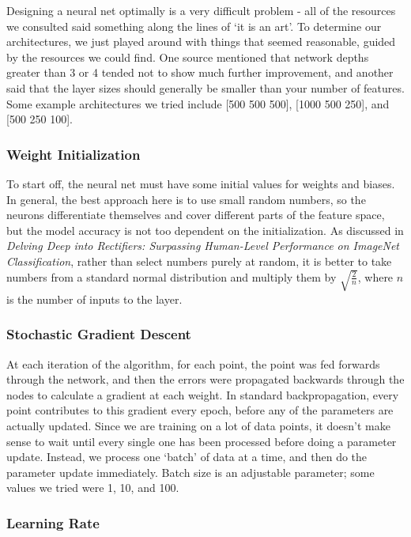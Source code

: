 \documentclass{article} %
\begin{document}
Designing a neural net optimally is a very difficult problem - all of the resources we consulted said something along the lines of `it is an art'. To determine our architectures, we just played around with things that seemed reasonable, guided by the resources we could find. One source mentioned that network depths greater than 3 or 4 tended not to show much further improvement, and another said that the layer sizes should generally be smaller than your number of features. Some example architectures we tried include [500 500 500], [1000 500 250], and [500 250 100].

\subsubsection*{Weight Initialization}

To start off, the neural net must have some initial values for weights and biases. In general, the best approach here is to use small random numbers, so the neurons differentiate themselves and cover different parts of the feature space, but the model accuracy is not too dependent on the initialization. As discussed in \emph{Delving Deep into Rectifiers: Surpassing Human-Level Performance on ImageNet Classification}, rather than select numbers purely at random, it is better to take numbers from a standard normal distribution and multiply them by $\sqrt{\frac{2}{n}}$, where $n$ is the number of inputs to the layer.

\subsubsection*{Stochastic Gradient Descent}

At each iteration of the algorithm, for each point, the point was fed forwards through the network, and then the errors were propagated backwards through the nodes to calculate a gradient at each weight. In standard backpropagation, every point contributes to this gradient every epoch, before any of the parameters are actually updated. Since we are training on a lot of data points, it doesn't make sense to wait until every single one has been processed before doing a parameter update. Instead, we process one `batch' of data at a time, and then do the parameter update immediately. Batch size is an adjustable parameter; some values we tried were 1, 10, and 100.

\subsubsection*{Learning Rate}
\end{document}
